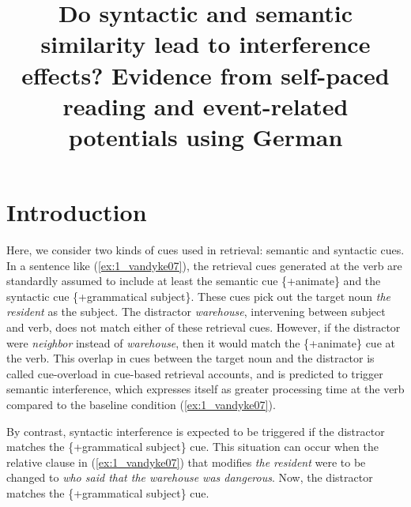 \documentclass[a4paper, man, floatsintext]{apa7}
\title{\hspace{1cm} Do syntactic and semantic similarity lead to interference effects?
\newline
Evidence from self-paced reading and event-related potentials using German}
\begin{document}
\maketitle

\section{Introduction}

\label{intro}

Here, we consider two kinds of cues used in retrieval: semantic and  syntactic cues.
In a sentence like (\ref{ex:1_vandyke07}), the retrieval cues generated at the verb are standardly assumed \parencite[e.g.,][]{vandyke07} to include at least the semantic cue \{+animate\} and the syntactic cue \{+grammatical subject\}. These cues pick out the target noun \textit{the resident} as the subject. The distractor \textit{warehouse}, intervening between subject and verb, does not match either of these retrieval cues. However, if the distractor were \textit{neighbor} instead of \textit{warehouse}, then it would match the \{+animate\} cue at the verb. This overlap in cues between the target noun and the distractor is called cue-overload in cue-based retrieval accounts, and is predicted to trigger semantic interference, which expresses itself as greater processing time at the verb compared to the baseline condition (\ref{ex:1_vandyke07}).

By contrast, syntactic interference is expected to be triggered if the distractor matches the \{+grammatical subject\} cue. This situation can occur when the relative clause  in (\ref{ex:1_vandyke07}) that modifies \textit{the resident} were to be changed to \textit{who said that the warehouse was dangerous}. Now, the distractor matches the \{+grammatical subject\} cue.
\end{document}
